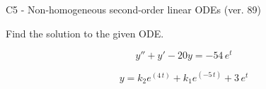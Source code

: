 \begin{exercise}
  \begin{exerciseTitle}C5 - Non-homogeneous second-order linear ODEs (ver. 89)\end{exerciseTitle}
  \begin{exerciseStatement}
    
Find the solution to the given ODE.

    
\[y''+y'-20y = -54 \, e^{t}\]

  \end{exerciseStatement}
  \begin{exerciseAnswer}
    
\[y= k_{2} e^{\left(4 \, t\right)} + k_{1} e^{\left(-5 \, t\right)} + 3 \, e^{t}\]

  \end{exerciseAnswer}
\end{exercise}